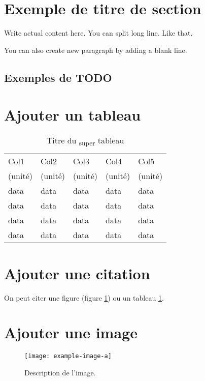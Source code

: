\section{Exemple de titre de section}

Write actual content here.
You can split long line.
Like that.

You can also create new paragraph by adding a blank line.

\subsection{Exemples de TODO}


\section{Ajouter un tableau}

\begin{table}[h!]
    \centering
    \caption{Titre du \textsubscript{super} tableau}
    \begin{tabular}{lllll}
        \hline
        Col1    & Col2    & Col3    & Col4    & Col5\\
        (unité) & (unité) & (unité) & (unité) & (unité)\\
        \hline\hline
        data & data & data & data & data\\
        data & data & data & data & data\\
        data & data & data & data & data\\
        data & data & data & data & data\\
        \hline
    \end{tabular}
    \label{tab:template-Vout}
\end{table}

\section{Ajouter une citation}

On peut citer
une figure (figure \ref{fig:template-example-image}) ou
un tableau \ref{tab:template-Vout}.

\section{Ajouter une image}

\begin{figure}[H]
    \centering
    \texttt{[image: example-image-a]}
    \caption{Description de l'image.}
    \label{fig:template-example-image}
\end{figure}
